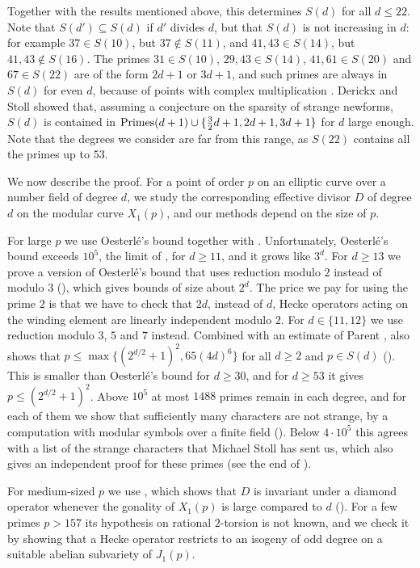 Together with the results mentioned above, this determines $S(d)$ for all $d\leq 22$. Note that $S(d')\subseteq S(d)$ if $d'$ divides $d$, but that $S(d)$ is not increasing in $d$: for example $37\in S(10)$, but $37\notin S(11)$, and $41,43\in S(14)$, but $41,43\notin S(16)$. The primes $31\in S(10)$, $29,43\in S(14)$, $41,61\in S(20)$ and $67\in S(22)$ are of the form $2d+1$ or $3d+1$, and such primes are always in $S(d)$ for even $d$, because of points with complex multiplication \cite[Corollary 7.5]{DSt}. Derickx and Stoll \cite[Corollary 7.8]{DSt} showed that, assuming a conjecture on the sparsity of strange newforms, $S(d)$ is contained in $\mathrm{Primes}(d+1)\cup\{\tfrac32 d+1,2d+1,3d+1\}$ for $d$ large enough. Note that the degrees we consider are far from this range, as $S(22)$ contains all the primes up to $53$.

We now describe the proof. For a point of order $p$ on an elliptic curve over a number field of degree $d$, we study the corresponding effective divisor $D$ of degree $d$ on the modular curve $X_1(p)$, and our methods depend on the size of $p$.

For large $p$ we use Oesterl\'e's bound together with \cite[Corollary 7.5]{DSt}. Unfortunately, Oesterl\'e's bound exceeds $10^5$, the limit of \cite[Table 2]{DSt}, for $d\geq 11$, and it grows like $3^d$. For $d\geq 13$ we prove a version of Oesterl\'e's bound that uses reduction modulo $2$ instead of modulo $3$ (), which gives bounds of size about $2^d$. The price we pay for using the prime $2$ is that we have to check that $2d$, instead of $d$, Hecke operators acting on the winding element are linearly independent modulo $2$. For $d\in\{11,12\}$ we use reduction modulo $3$, $5$ and $7$ instead. Combined with an estimate of Parent \cite[Proposition 1.9]{parentformal},  also shows that $p\leq\max\{(2^{d/2}+1)^2,65(4d)^6\}$ for all $d\geq2$ and $p\in S(d)$ (). This is smaller than Oesterl\'e's bound for $d\geq30$, and for $d\geq53$ it gives $p\leq(2^{d/2}+1)^2$. Above $10^5$ at most $1488$ primes remain in each degree, and for each of them we show that sufficiently many characters are not strange, by a computation with modular symbols over a finite field (). Below $4\cdot10^5$ this agrees with a list of the strange characters that Michael Stoll has sent us, which also gives an independent proof for these primes (see the end of ).

For medium-sized $p$ we use \cite[Proposition 4.1]{DSt}, which shows that $D$ is invariant under a diamond operator whenever the gonality of $X_1(p)$ is large compared to $d$ (). For a few primes $p>157$ its hypothesis on rational $2$-torsion is not known, and we check it by showing that a Hecke operator restricts to an isogeny of odd degree on a suitable abelian subvariety of $J_1(p)$.

